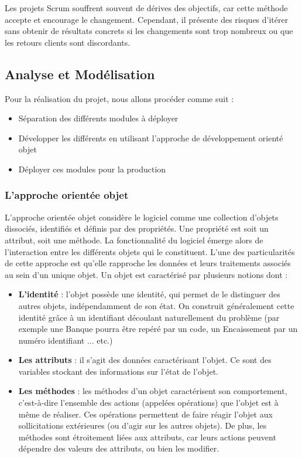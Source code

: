Les projets Scrum souffrent souvent de dérives des objectifs, car cette méthode accepte et encourage le changement. Cependant, il présente des risques d’itérer sans obtenir de résultats concrets si les changements sont trop nombreux ou que les retours clients sont discordants.

\subsection{Analyse et Modélisation}

Pour la réalisation du projet, nous allons procéder comme suit :

\vspace{1em}
\begin{itemize}
	\setlength\itemsep{1em}
	\item Séparation des différents modules à déployer
	\item Développer les différents en utilisant l'approche de développement orienté objet
	\item Déployer ces modules pour la production
\end{itemize}

\subsubsection{L’approche orientée objet}

L’approche orientée objet considère le logiciel comme une collection d’objets dissociés,
identifiés et définis par des propriétés. Une propriété est soit un attribut, soit une méthode.
La fonctionnalité du logiciel émerge alors de l’interaction entre les différents objets qui le
constituent. L’une des particularités de cette approche est qu’elle rapproche les données et
leurs traitements associés au sein d’un unique objet. Un objet est caractérisé par plusieurs
notions dont :

\vspace{1em}
\begin{itemize}
	\setlength\itemsep{1em}
	\item \textbf{L’identité} : l’objet possède une identité, qui permet de le distinguer des autres objets, indépendamment de son état. On construit généralement cette identité grâce à un identifiant
	      découlant naturellement du problème (par exemple une Banque pourra être repéré par un code,
	      un Encaissement par un numéro identifiant ... etc.)
	\item \textbf{Les attributs} : il s’agit des données caractérisant l’objet. Ce sont des variables stockant des
	      informations sur l’état de l’objet.
	\item \textbf{Les méthodes} : les méthodes d’un objet caractérisent son comportement, c’est-à-dire l’ensemble
	      des actions (appelées opérations) que l’objet est à même de réaliser. Ces opérations permettent
	      de faire réagir l’objet aux sollicitations extérieures (ou d’agir sur les autres objets). De plus, les
	      méthodes sont étroitement liées aux attributs, car leurs actions peuvent dépendre des valeurs
	      des attributs, ou bien les modifier.
\end{itemize}

